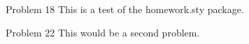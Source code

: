 \documentclass[12pt]{article}
\begin{document}
\top %
\begin{solution}{Problem 18}
This is a test of the homework.sty package.
\end{solution}
\begin{solution}{Problem 22}
This would be a second problem.
\end{solution}
\end{document}

